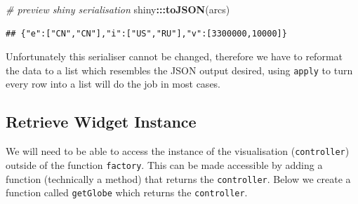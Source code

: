 \documentclass[
]{krantz}
\makeatletter
\newenvironment{Shaded}{\begin{snugshade}}{\end{snugshade}}
\newcommand{\CommentTok}[1]{\textcolor[rgb]{0.37,0.37,0.37}{\textit{#1}}}
\newcommand{\ControlFlowTok}[1]{\textcolor[rgb]{0.27,0.27,0.27}{\textbf{#1}}}
\newcommand{\DataTypeTok}[1]{\textcolor[rgb]{0.27,0.27,0.27}{#1}}
\newcommand{\DecValTok}[1]{\textcolor[rgb]{0.06,0.06,0.06}{#1}}
\newcommand{\KeywordTok}[1]{\textcolor[rgb]{0.27,0.27,0.27}{\textbf{#1}}}
\newcommand{\NormalTok}[1]{#1}
\newcommand{\OperatorTok}[1]{\textcolor[rgb]{0.43,0.43,0.43}{\textbf{#1}}}
\newcommand{\StringTok}[1]{\textcolor[rgb]{0.5,0.5,0.5}{#1}}
\newenvironment{kframe}{%
\medskip{}
\setlength{\fboxsep}{.8em}
 \def\at@end@of@kframe{}%
 \ifinner\ifhmode%
  \def\at@end@of@kframe{\end{minipage}}%
  \begin{minipage}{\columnwidth}%
 \fi\fi%
 \def\FrameCommand##1{\hskip\@totalleftmargin \hskip-\fboxsep
 \colorbox{shadecolor}{##1}\hskip-\fboxsep
     \hskip-\linewidth \hskip-\@totalleftmargin \hskip\columnwidth}%
 \MakeFramed {\advance\hsize-\width
   \@totalleftmargin\z@ \linewidth\hsize
   \@setminipage}}%
 {\par\unskip\endMakeFramed%
 \at@end@of@kframe}
\renewenvironment{Shaded}{\begin{kframe}}{\end{kframe}}
\makeatother
\begin{document}
\begin{Shaded}
\begin{Highlighting}[]
\CommentTok{\# preview shiny serialisation}
\NormalTok{shiny}\OperatorTok{:::}\KeywordTok{toJSON}\NormalTok{(arcs)}
\end{Highlighting}
\end{Shaded}

\begin{verbatim}
## {"e":["CN","CN"],"i":["US","RU"],"v":[3300000,10000]}
\end{verbatim}

Unfortunately this serialiser cannot be changed, therefore we have to reformat the data to a list which resembles the JSON output desired, using \texttt{apply} to turn every row into a list will do the job in most cases.

\begin{Shaded}
\end{Shaded}

\hypertarget{retrieve-widget-instance}{%
\subsection*{Retrieve Widget Instance}\label{retrieve-widget-instance}}


We will need to be able to access the instance of the visualisation (\texttt{controller}) outside of the function \texttt{factory}. This can be made accessible by adding a function (technically a method) that returns the \texttt{controller}. Below we create a function called \texttt{getGlobe} which returns the \texttt{controller}.
\end{document}
